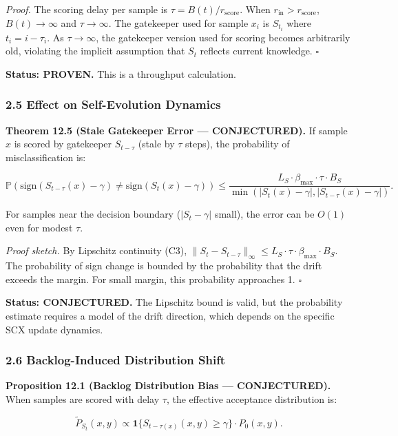 \documentclass[
  12pt,
]{article}
\begin{document}
\emph{Proof.} The scoring delay per sample is
\(\tau = B(t) / r_{\text{score}}\). When
\(r_{\text{in}} > r_{\text{score}}\), \(B(t) \to \infty\) and
\(\tau \to \infty\). The gatekeeper used for sample \(x_i\) is
\(S_{t_i}\) where \(t_i = i - \tau_i\). As \(\tau \to \infty\), the
gatekeeper version used for scoring becomes arbitrarily old, violating
the implicit assumption that \(S_t\) reflects current knowledge.
\(\square\)

\textbf{Status: PROVEN.} This is a throughput calculation.

\subsubsection{2.5 Effect on Self-Evolution
Dynamics}\label{effect-on-self-evolution-dynamics}

\textbf{Theorem 12.5 (Stale Gatekeeper Error --- CONJECTURED).} If
sample \(x\) is scored by gatekeeper \(S_{t-\tau}\) (stale by \(\tau\)
steps), the probability of misclassification is:

\[\mathbb{P}(\text{sign}(S_{t-\tau}(x) - \gamma) \neq \text{sign}(S_t(x) - \gamma)) \leq \frac{L_S \cdot \beta_{\max} \cdot \tau \cdot B_S}{\min(|S_t(x) - \gamma|, |S_{t-\tau}(x) - \gamma|)}.\]

For samples near the decision boundary (\(|S_t - \gamma|\) small), the
error can be \(O(1)\) even for modest \(\tau\).

\emph{Proof sketch.} By Lipschitz continuity (C3),
\(\|S_t - S_{t-\tau}\|_\infty \leq L_S \cdot \tau \cdot \beta_{\max} \cdot B_S\).
The probability of sign change is bounded by the probability that the
drift exceeds the margin. For small margin, this probability approaches
1. \(\square\)

\textbf{Status: CONJECTURED.} The Lipschitz bound is valid, but the
probability estimate requires a model of the drift direction, which
depends on the specific SCX update dynamics.

\subsubsection{2.6 Backlog-Induced Distribution
Shift}\label{backlog-induced-distribution-shift}

\textbf{Proposition 12.1 (Backlog Distribution Bias --- CONJECTURED).}
When samples are scored with delay \(\tau\), the effective acceptance
distribution is:

\[\tilde{P}_{S_t}(x,y) \propto \mathbf{1}\{S_{t-\tau(x)}(x,y) \geq \gamma\} \cdot P_0(x,y).\]
\end{document}
